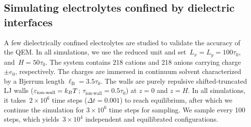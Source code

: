 \subsection{Simulating electrolytes confined by dielectric interfaces}


A few dielectrically confined electrolytes are studied to validate the accuracy of the QEM.
In all simulations, we use the reduced unit and set~$L_x = L_y = 100 \tau_0$, and~$H = 50 \tau_0$.
The system contains 218 cations and 218 anions carrying charge~$\pm e_0$, respectively.
The charges are immersed in continuum solvent characterized by a Bjerrum length $\ell_{\mathrm B} = 3.5 \tau_0$.
The walls are purely repulsive shifted-truncated LJ walls ($\varepsilon_\text{ion-wall} = k_B T$; $\tau_\text{ion-wall} = 0.5 \tau_0$) at $z = 0$ and $z = H$.
In all simulations, it takes~$2 \times 10^6$ time steps ($\Delta t = 0.001$) to reach equilibrium, after which we continue the simulation for $3 \times 10^6$ time steps for sampling.
We sample every 100 steps, which yields~$3 \times 10^{4}$ independent and equilibrated configurations.

